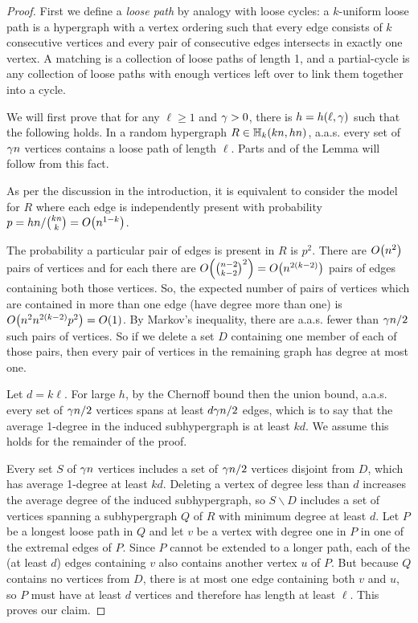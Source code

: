 \documentclass[11pt,english]{article}
\theoremstyle{plain}
\theoremstyle{definition}
\theoremstyle{definition}
\theoremstyle{plain}
\theoremstyle{plain}
\theoremstyle{plain}
\theoremstyle{plain}
\theoremstyle{remark}
\theoremstyle{remark}
\let\originalleft\left
\let\originalright\right
\renewcommand{\left}{\mathopen{}\mathclose\bgroup\originalleft}
\renewcommand{\right}{\aftergroup\egroup\originalright}
\begin{document}
\begin{proof}
First we define a \emph{loose path} by analogy with loose cycles:
a $k$-uniform loose path is a hypergraph with a vertex ordering such
that every edge consists of $k$ consecutive vertices and every pair
of consecutive edges intersects in exactly one vertex. A matching
is a collection of loose paths of length 1, and a partial-cycle is any
collection of loose paths with enough vertices left over to link them
together into a cycle.

We will first prove that for any $\ell\ge1$ and $\gamma>0$, there
is $h=h\left(\ell,\patheps\right)$ such that the following holds. In a
random hypergraph $R\in\HH_{k}\left(kn,hn\right)$,
a.a.s. every set of $\gamma n$ vertices contains a loose path of length
$\ell$. Parts  and  of the Lemma will follow from this fact.

As per the discussion in the introduction, it is equivalent to consider
the model for $R$ where each edge is independently present with probability
$p=hn/{kn \choose k}=O\left(n^{1-k}\right)$.

The probability a particular pair of edges is present in $R$ is $p^2$. There are $O\left(n^2\right)$ pairs of vertices and for each there are $O\left({n-2\choose k-2}^2\right)=
O\left(n^{2\left(k-2\right)}\right)$ pairs of edges containing both those vertices. So, the expected number of pairs of vertices
which are contained in more than one edge (have degree more than one)
is $O\left(n^2n^{2\left(k-2\right)}p^2\right)=O\left(1\right)$. By Markov's inequality, there are a.a.s. fewer
than $\gamma n/2$ such pairs of vertices. So if we delete a
set $D$ containing one member of each of those pairs, then every pair of vertices in the remaining graph has
degree at most one.

Let $d=k\ell$. For
large $h$, by the Chernoff bound then the union
bound, a.a.s. every set of $\gamma n/2$ vertices spans at least $d\gamma n/2$
edges, which is to say that the average 1-degree in the induced subhypergraph
is at least $kd$. We assume this holds for the remainder of the proof.

Every set $S$ of $\gamma n$ vertices includes a set of $\gamma n/2$
vertices disjoint from $D$, which has average 1-degree at least $kd$.
Deleting a vertex of degree less than $d$ increases the average degree
of the induced subhypergraph, so $S\backslash D$ includes a set of
vertices spanning a subhypergraph $Q$ of $R$ with minimum degree
at least $d$. Let $P$ be a longest loose path in $Q$ and let $v$
be a vertex with degree one in $P$ in one of the extremal edges of $P$. Since $P$ cannot
be extended to a longer path, each of the (at least $d$) edges containing
$v$ also contains another vertex $u$ of $P$. But because $Q$ contains
no vertices from $D$, there is at most
one edge containing both $v$ and $u$, so $P$ must have at least
$d$ vertices and therefore has length at least $\ell$. This proves
our claim.


\end{proof}
\end{document}
